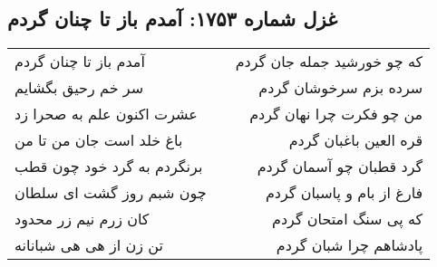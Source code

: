 \begin{center}
\section*{غزل شماره ۱۷۵۳: آمدم باز تا چنان گردم}
\label{sec:1753}
\begin{longtable}{l p{0.5cm} r}
آمدم باز تا چنان گردم
&&
که چو خورشید جمله جان گردم
\\
سر خم رحیق بگشایم
&&
سرده بزم سرخوشان گردم
\\
عشرت اکنون علم به صحرا زد
&&
من چو فکرت چرا نهان گردم
\\
باغ خلد است جان من تا من
&&
قره العین باغبان گردم
\\
برنگردم به گرد خود چون قطب
&&
گرد قطبان چو آسمان گردم
\\
چون شبم روز گشت ای سلطان
&&
فارغ از بام و پاسبان گردم
\\
کان زرم نیم زر محدود
&&
که پی سنگ امتحان گردم
\\
تن زن از هی هی شبانانه
&&
پادشاهم چرا شبان گردم
\\
\end{longtable}
\end{center}
